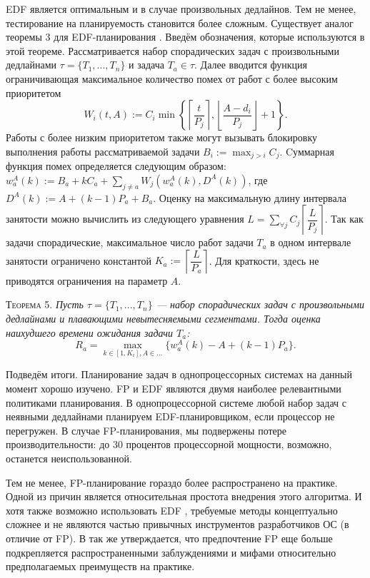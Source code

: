 EDF является оптимальным и в случае произвольных дедлайнов. Тем не менее, тестирование на планируемость становится более сложным. Существует аналог теоремы 3 для EDF-планирования \cite{Harbour2003ResponseTA}. Введём обозначения, которые используются в этой теореме. Рассматривается набор спорадических задач с произвольными дедлайнами $\tau = \{T_1, ... , T_n\}$ и задача $T_a \in \tau$. Далее вводится функция ограничивающая максимальное количество помех от работ с более высоким приоритетом $$W_i(t, A) := C_i \min{ \left \{ \left \lceil \dfrac{t}{P_j} \right \rceil, \left \lfloor \dfrac{A - d_i}{P_j} \right \rfloor + 1 \right \} }.$$ Работы с более низким приоритетом также могут вызывать блокировку выполнения работы рассматриваемой задачи $B_i := \max_{j>i} C_{j}$. Cуммарная функция помех определяется следующим образом: $w_a^A(k) := B_a + k C_a + \sum_{j \neq a} W_j(w^A_a(k), D^A(k))$, где $D^A(k) := A + (k - 1)P_a + B_a $. Оценку на максимальную длину интервала занятости можно вычислить из следующего уравнения $L = \sum_{\forall j} C_j \left \lceil \dfrac{L}{P_j} \right \rceil$. Так как задачи спорадические, максимальное число работ задачи $T_a$ в одном интервале занятости ограничено константой $K_a := \left \lceil \dfrac{L}{P_a} \right \rceil$. Для краткости, здесь не приводятся ограничения на параметр $A$.

\textsc{Теорема 5. }
\textit{Пусть $\tau = \{T_1, ... , T_n\}$ --- набор спорадических задач с произвольными дедлайнами и плавающими невытесняемыми сегментами. Тогда оценка
  наихудшего времени ожидания задачи $T_a$: $$R_a = \max_{k \in [1, K_i], A \in ...} \{ w_a^A(k) - A  + (k - 1)P_a \}.$$}

Подведём итоги. Планирование задач в однопроцессорных системах на данный момент хорошо изучено. FP и EDF являются двумя наиболее релевантными политиками планирования. В однопроцессорной системе любой набор задач с неявными дедлайнами планируем EDF-планировщиком, если процессор не перегружен. В случае FP-планирования, мы подвержены потере производительности: до 30 процентов процессорной мощности, возможно, останется неиспользованной.

Тем не менее, FP-планирование гораздо более распространено на практике. Одной из причин является относительная простота внедрения этого алгоритма. И хотя также возможно использовать EDF \cite{Short2010ImprovedTM}, требуемые методы концептуально сложнее и не являются частью привычных инструментов разработчиков ОС (в отличие от FP). В \cite{Buttazzo2003RateMV} так же утверждается, что предпочтение FP еще больше подкрепляется распространенными заблуждениями и мифами относительно предполагаемых преимуществ на практике.

